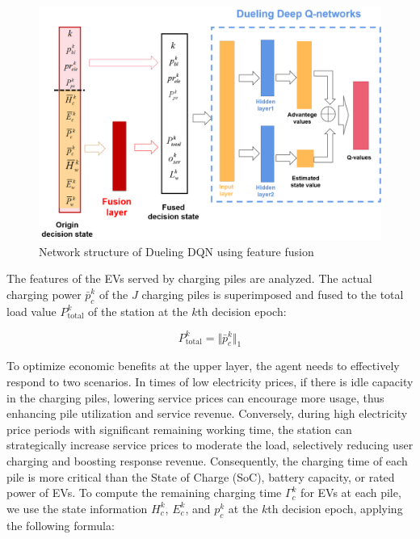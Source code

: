 \documentclass[preprint,12pt]{elsarticle}
\begin{document}
\begin{figure}[tb]
    \centering
    \includegraphics[width=1\linewidth]{figures/Feature Fusion.png}
    \caption{Network structure of Dueling DQN using feature fusion}
    \label{fig:Network-FF-DDQN}
\end{figure}

The features of the EVs served by charging piles are analyzed. The actual charging power $\bar{p}_{c}^{k}$ of the $J$ charging piles is superimposed and fused to the total load value $P_{\textrm{total}}^{k}$ of the station at the $k$th decision epoch:

\begin{equation}
P_{\textrm{total}}^{k}=\biggl\Vert\bar{p}_{c}^{k}\biggr\Vert_{1}
\end{equation}

To optimize economic benefits at the upper layer, the agent needs to effectively respond to two scenarios. In times of low electricity prices, if there is idle capacity in the charging piles, lowering service prices can encourage more usage, thus enhancing pile utilization and service revenue. Conversely, during high electricity price periods with significant remaining working time, the station can strategically
increase service prices to moderate the load, selectively reducing user charging and boosting response revenue. Consequently, the charging time of each pile is more critical than the State of Charge (SoC),
battery capacity, or rated power of EVs. To compute the remaining charging time $\Gamma_{c}^{k}$ for EVs at each pile, we use the state information $H_{c}^{k}$, $E_{c}^{k}$, and $p_{c}^{k}$ at the $k$th decision epoch, applying the following formula:
\end{document}
